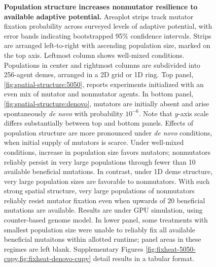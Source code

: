 \begin{figure}[h]
  \begin{minipage}{\textwidth}
    \caption{%
      \textbf{Population structure increases nonmutator resilience to available adaptive potential.}
      \footnotesize
      Areaplot strips track mutator fixation probability across surveyed levels of adaptive potential, with error bands indicating bootstrapped 95\% confidence intervals.
      Strips are arranged left-to-right with ascending population size, marked on the top axis.
      Leftmost column shows well-mixed conditions.
      Populations in center and rightmost columns are subdivided into 256-agent demes, arranged in a 2D grid or 1D ring.
      Top panel, \ref{fig:spatial-structure:5050}, reports experiments initialized with an even mix of mutator and nonmutator agents.
      In bottom panel, \ref{fig:spatial-structure:denovo}, mutators are initially absent and arise spontaneously \textit{de novo} with probability $10^{-6}$.
      Note that $y$-axis scale differs substantially between top and bottom panels.
      Effects of population structure are more pronounced under \textit{de novo} conditions, when initial supply of mutators is scarce.
      Under well-mixed conditions, increase in population size favors mutators; nonmutators reliably persist in very large populations through fewer than 10 available beneficial mutations.
      In contrast, under 1D deme structure, very large population sizes are favorable to nonmutators.
      With such strong spatial structure, very large populations of nonmutators reliably resist mutator fixation even when upwards of 20 beneficial mutations are available.
      Results are under GPU simulation, using counter-based genome model.
      In lower panel, some treatments with smallest population size were unable to reliably fix all available beneficial mutaitons within allotted runtime; panel areas in these regimes are left blank.
      Supplementary Figures \cref{fig:fixheat-5050-cupy,fig:fixheat-denovo-cupy} detail results in a tabular format.
    }
    \label{fig:spatial-structure}
  \end{minipage}
\end{figure}
